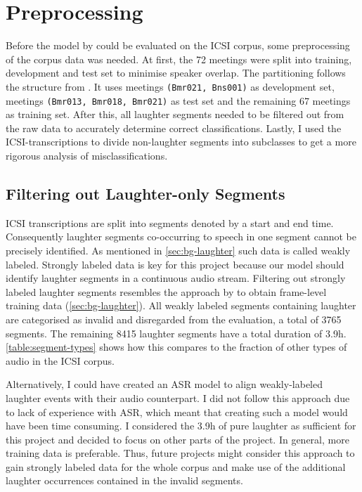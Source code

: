 \documentclass[bsc,frontabs,parskip,deptreport]{infthesis}
\begin{document}
\section{Preprocessing} \label{sec:preprocessing}
Before the model by \citet{gillick2021robust} could be evaluated on the ICSI corpus, some preprocessing of the corpus data was needed.
At first, the 72 meetings were split into training, development and test set to minimise speaker overlap. The partitioning follows the structure from \citet{renals2014neural}. It uses meetings \texttt{(Bmr021, Bns001)} as development set, meetings \texttt{(Bmr013, Bmr018, Bmr021)} as test set and the remaining 67 meetings as training set.
After this, all laughter segments needed to be filtered out from the raw data to accurately determine correct classifications. 
Lastly, I used the ICSI-transcriptions to divide non-laughter segments into subclasses to get a more rigorous analysis of misclassifications.

\subsection{Filtering out Laughter-only Segments} \label{subsec:filter-laughter}
ICSI transcriptions are split into segments denoted by a start and end time.
Consequently laughter segments co-occurring to speech in one segment cannot be precisely identified.
As mentioned in \autoref{sec:bg-laughter} such data is called weakly labeled.
Strongly labeled data is key for this project because our model should identify laughter segments in a continuous audio stream.
Filtering out strongly labeled laughter segments resembles the approach by \citet{knox2006automatic} to obtain frame-level training data (\autoref{sec:bg-laughter}). 
All weakly labeled segments containing laughter are categorised as invalid and disregarded from the evaluation, a total of 3765 segments.
The remaining 8415 laughter segments have a total duration of 3.9h. \autoref{table:segment-types} shows how this compares to the fraction of other types of audio in the ICSI corpus.

Alternatively, I could have created an ASR model to align weakly-labeled laughter events with their audio counterpart. 
I did not follow this approach due to lack of experience with ASR, which meant that creating such a model would have been time consuming. I considered the 3.9h of pure laughter as sufficient for this project and decided to focus on other parts of the project.
In general, more training data is preferable. Thus, future projects might consider this approach to gain strongly labeled data for the whole corpus and make use of the additional laughter occurrences contained in the invalid segments. 
\end{document}
